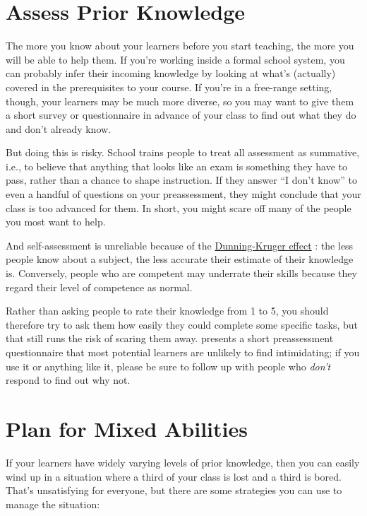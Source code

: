 \section{Assess Prior Knowledge}\label{s:classroom-prior}

The more you know about your learners before you start teaching, the
more you will be able to help them.  If you're working inside a formal
school system, you can probably infer their incoming knowledge by
looking at what's (actually) covered in the prerequisites to your
course.  If you're in a free-range setting, though, your learners may
be much more diverse, so you may want to give them a short survey or
questionnaire in advance of your class to find out what they do and
don't already know.

But doing this is risky.  School trains people to treat all assessment
as summative, i.e., to believe that anything that looks like an exam
is something they have to pass, rather than a chance to shape
instruction.  If they answer ``I don't know'' to even a handful of
questions on your preassessment, they might conclude that your class
is too advanced for them.  In short, you might scare off many of the
people you most want to help.

And self-assessment is unreliable because of the
\href{https://en.wikipedia.org/wiki/Dunning\%E2\%80\%93Kruger_effect}{Dunning-Kruger
  effect} \cite{Krug1999}: the less people know about a subject, the
less accurate their estimate of their knowledge is.  Conversely,
people who are competent may underrate their skills because they
regard their level of competence as normal.

Rather than asking people to rate their knowledge from 1 to 5, you
should therefore try to ask them how easily they could complete some
specific tasks, but that still runs the risk of scaring them away.
 presents a short preassessment questionnaire
that most potential learners are unlikely to find intimidating; if you
use it or anything like it, please be sure to follow up with people
who \emph{don't} respond to find out why not.

\section{Plan for Mixed Abilities}\label{s:classroom-mixed}

If your learners have widely varying levels of prior knowledge, then
you can easily wind up in a situation where a third of your class is
lost and a third is bored.  That's unsatisfying for everyone, but
there are some strategies you can use to manage the situation:

